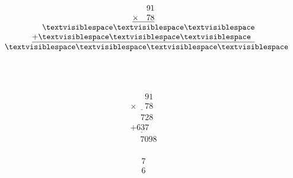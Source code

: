 \begin{minipage}[t]{0.3\linewidth}
\begin{align*}\begin{array}{c}
\phantom{
\times00
}
91\\
\underline{
\times
\phantom{
00
}
78
}\\
\phantom{
+0
}
\textvisiblespace
\textvisiblespace
\textvisiblespace
\\
\underline{
+
\textvisiblespace
\textvisiblespace
\textvisiblespace
\phantom0
}
\\
\phantom{+}
\textvisiblespace
\textvisiblespace
\textvisiblespace
\textvisiblespace
\end{array}\end{align*}
\end{minipage}
\begin{minipage}[t]{0.05\linewidth}
\begin{align*}\begin{array}{c}
\textvisiblespace
\\
\textvisiblespace
\end{array}\end{align*}
\end{minipage}
\begin{minipage}[t]{0.3\linewidth}
\begin{align*}\begin{array}{c}
\phantom{
\times00
}
91\\
\underline{
\times
\phantom{
00
}
78
}\\
\phantom{
+0
}
728
\\
\underline{
+
637
\phantom0
}
\\
\phantom{+}
7098
\end{array}\end{align*}
\end{minipage}
\begin{minipage}[t]{0.05\linewidth}
\begin{align*}\begin{array}{c}
7
\\
6
\end{array}\end{align*}
\end{minipage}

